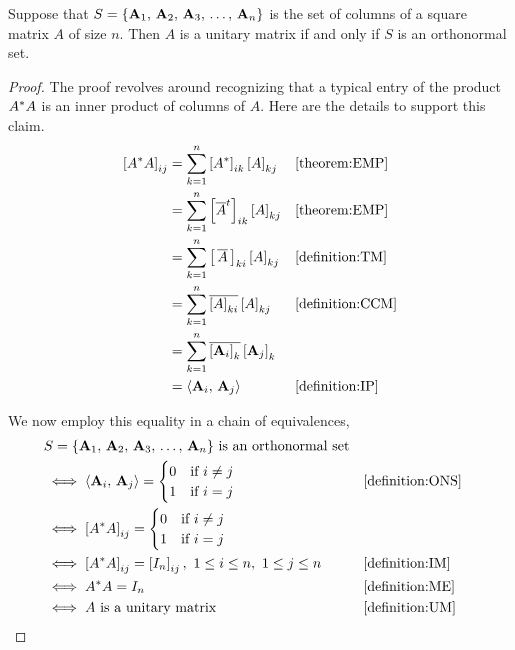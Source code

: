 \documentclass{ximera}
\begin{document}
\begin{theorem}
\label{theorem:CUMOS}

Suppose that $S=\left\{\mathbf{A}_{1},\,\mathbf{A}_{2},\,\mathbf{A}_{3},\,\ldots,\,\mathbf{A}_{n}\right\}$ is the set of columns of a
square matrix $A$ of size $n$.  Then $A$ is a unitary matrix if and
only if $S$ is an orthonormal set.

\begin{proof}
  The proof revolves around recognizing that a typical entry of the product $A^\ast A$ is an inner product of columns of $A$.  Here are the details to support this claim.
  \begin{align*}
    \left\lbrack A^\ast A\right\rbrack_{ij}
    &=\sum_{k=1}^{n}\left\lbrack A^\ast\right\rbrack_{ik}\left\lbrack A\right\rbrack_{kj}
    &&\ref{theorem:EMP}\\
    &=\sum_{k=1}^{n}\left\lbrack\overline{A}^{t}\right\rbrack_{ik}\left\lbrack A\right\rbrack_{kj}
    &&\ref{theorem:EMP}\\
    &=\sum_{k=1}^{n}\left\lbrack\,\overline{A}\,\right\rbrack_{ki}\left\lbrack A\right\rbrack_{kj}
    &&\ref{definition:TM}\\
    &=\sum_{k=1}^{n}\overline{\left\lbrack A\right\rbrack_{ki}}\left\lbrack A\right\rbrack_{kj}
    &&\ref{definition:CCM}\\
    &=\sum_{k=1}^{n}\overline{\left\lbrack\mathbf{A}_i\right\rbrack_{k}}\left\lbrack\mathbf{A}_j\right\rbrack_{k}\\
    &=\left\langle\mathbf{A}_i,\,\mathbf{A}_j\right\rangle
    &&\ref{definition:IP}
  \end{align*}
  
  We now employ this equality in a chain of equivalences,
  \begin{align*}
    &\text{$S=\set{\vectorlist{A}{n}}$ is an orthonormal set}\\
    &\iff \innerproduct{\vect{A}_i}{\vect{A}_j}=
      \begin{cases}
        0 &\text{if $i\neq j$}\\
        1 & \text{if $i=j$}
      \end{cases}&&\ref{definition:ONS}\\
    &\iff \matrixentry{\adjoint{A}A}{ij}=
      \begin{cases}
        0 &\text{if $i\neq j$}\\
        1 & \text{if $i=j$}
      \end{cases}\\
    &\iff \matrixentry{\adjoint{A}A}{ij}=\matrixentry{I_n}{ij},\ 1\leq i\leq n,\ 1\leq j\leq n
    &&\ref{definition:IM}\\
    &\iff \adjoint{A}A=I_n
    &&\ref{definition:ME}\\
    &\iff \text{$A$ is a unitary matrix}
    &&\ref{definition:UM}
  \end{align*}

\end{proof}
\end{theorem}
\end{document}
